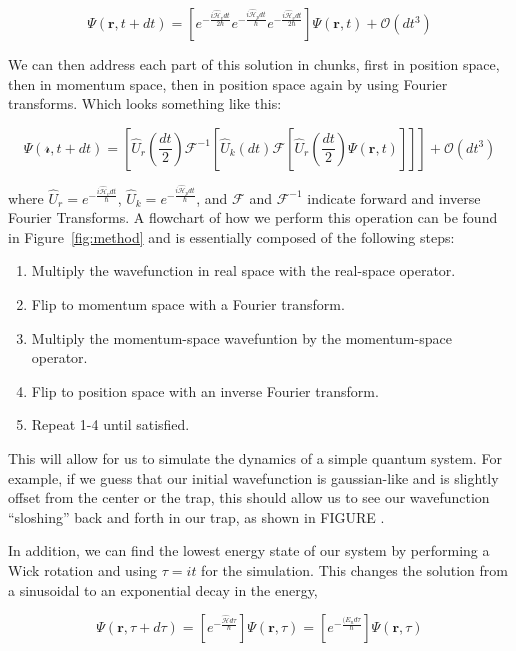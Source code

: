 $$
\Psi(\mathbf{r},t+dt) = \left[e^{-\frac{i\mathcal{\hat{H}}_vdt}{2\hbar}}e^{-\frac{i\mathcal{\hat{H}}_pdt}{\hbar}}e^{-\frac{i\mathcal{\hat{H}}_vdt}{2\hbar}} \right]\Psi(\mathbf{r},t) + \mathcal{O}(dt^3)
$$

\noindent We can then address each part of this solution in chunks, first in position space, then in momentum space, then in position space again by using Fourier transforms.
Which looks something like this:

$$
\Psi(\mathcal{r}, t+dt) = \left[\hat{U}_r\left(\frac{dt}{2}\right)\mathcal{F}^{-1}\left[\hat{U}_k(dt) \mathcal{F} \left[\hat{U}_r\left(\frac{dt}{2}\right) \Psi(\mathbf{r},t) \right] \right] \right] + \mathcal{O}(dt^3)
$$

where $\hat{U}_r = e^{-\frac{i\mathcal{\hat{H}}_vdt}{\hbar}}$, $\hat{U}_k = e^{-\frac{i\mathcal{\hat{H}}_pdt}{\hbar}}$, and $\mathcal{F}$ and $\mathcal{F}^{-1}$ indicate forward and inverse Fourier Transforms.
A flowchart of how we perform this operation can be found in Figure~\ref{fig:method} and is essentially composed of the following steps:

\begin{enumerate}
\item Multiply the wavefunction in real space with the real-space operator.
\item Flip to momentum space with a Fourier transform.
\item Multiply the momentum-space wavefuntion by the momentum-space operator.
\item Flip to position space with an inverse Fourier transform.
\item Repeat 1-4 until satisfied.
\end{enumerate}

This will allow for us to simulate the dynamics of a simple quantum system.
For example, if we guess that our initial wavefunction is gaussian-like and is slightly offset from the center or the trap, this should allow us to see our wavefunction ``sloshing'' back and forth in our trap, as shown in FIGURE .

In addition, we can find the lowest energy state of our system by performing a Wick rotation and using $\tau = it$ for the simulation.
This changes the solution from a sinusoidal to an exponential decay in the energy,

$$
\Psi(\mathbf{r},\tau + d\tau) = \left[e^{-\frac{\mathcal{\hat{H}}d\tau}{\hbar}}\right]\Psi(\mathbf{r},\tau) = \left[e^{-\frac{(E_n d\tau}{\hbar}}\right]\Psi(\mathbf{r},\tau)
$$

